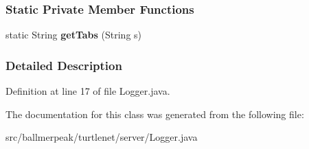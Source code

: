 \subsubsection*{Static Private Member Functions}
\begin{DoxyCompactItemize}
\item 
\hypertarget{classballmerpeak_1_1turtlenet_1_1server_1_1Logger_ab10e5c8454d7cdf047b2c53bf040afc0}{static String {\bfseries get\-Tabs} (String s)}\label{classballmerpeak_1_1turtlenet_1_1server_1_1Logger_ab10e5c8454d7cdf047b2c53bf040afc0}

\end{DoxyCompactItemize}


\subsubsection{Detailed Description}


Definition at line 17 of file Logger.\-java.



The documentation for this class was generated from the following file\-:\begin{DoxyCompactItemize}
\item 
src/ballmerpeak/turtlenet/server/Logger.\-java\end{DoxyCompactItemize}
